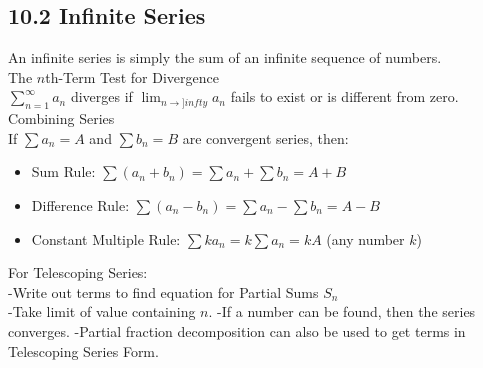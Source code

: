 \documentclass{article}
\begin{document}
        \subsection*{10.2 Infinite Series}
            An infinite series is simply the sum of an infinite sequence of numbers. \\
            The $n$th-Term Test for Divergence \\
            $\sum_{n=1}^{\infty} a_{n}$ diverges if $\lim_{n\to]infty} a_{n}$ fails to exist or is different from zero. \\
            Combining Series \\
            If $\sum a_{n} = A$ and $\sum b_{n} = B$ are convergent series, then: \\         
            \begin{itemize}
                \item Sum Rule: $\sum (a_{n}+b_{n}) = \sum a_{n} + \sum b_{n} = A + B$ \\
                \item Difference Rule: $\sum (a_{n}-b_{n}) = \sum a_{n} - \sum b_{n} = A - B$ \\
                \item Constant Multiple Rule: $\sum ka_{n} = k\sum a_{n} =  kA$ (any number $k$) \\
            \end{itemize}
            For Telescoping Series: \\
            -Write out terms to find equation for Partial Sums $S_{n}$ \\
            -Take limit of value containing $n$.
            -If a number can be found, then the series converges.
            -Partial fraction decomposition can also be used to get terms in Telescoping Series Form. \\
        \color{Brown}
\end{document}
